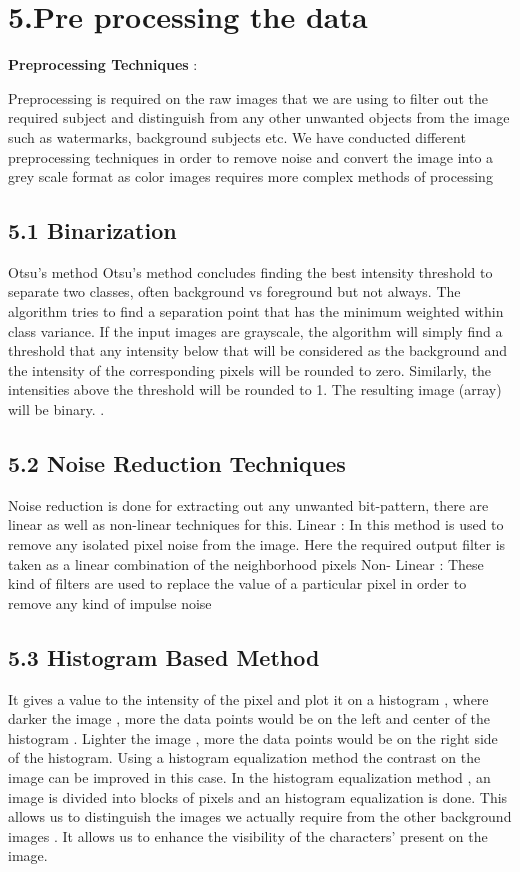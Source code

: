 \documentclass[9pt,twocolumn,twoside]{../../styles/osajnl}
\begin{document}
\section{5.Pre processing the data}


\textbf{Preprocessing Techniques} :

Preprocessing is required on the raw images that we are using to
filter out the required subject and distinguish from any other
unwanted objects from the image such as watermarks, background
subjects etc. We have conducted different preprocessing techniques in
order to remove noise and convert the image into a grey scale format
as color images requires more complex methods of processing

\subsection{5.1 Binarization}

Otsu’s method \cite{otsu1975threshold} Otsu’s method concludes finding
the best intensity threshold to separate two classes, often background
vs foreground but not always. The algorithm tries to find a separation
point that has the minimum weighted within class variance.  If the
input images are grayscale, the algorithm will simply find a threshold
that any intensity below that will be considered as the background and
the intensity of the corresponding pixels will be rounded to
zero. Similarly, the intensities above the threshold will be rounded
to 1. The resulting image (array) will be binary.  .
 
\subsection{5.2 Noise Reduction Techniques}

Noise reduction is done for extracting out any unwanted bit-pattern,
there are linear as well as non-linear techniques for this.  Linear :
In this method is used to remove any isolated pixel noise from the
image. Here the required output filter is taken as a linear
combination of the neighborhood pixels Non- Linear : These kind of
filters are used to replace the value of a particular pixel in order
to remove any kind of impulse noise

\subsection{5.3 Histogram Based Method}

It gives a value to the intensity of the pixel and plot it on a
histogram , where darker the image , more the data points would be on
the left and center of the histogram . Lighter the image , more the
data points would be on the right side of the histogram. Using a
histogram equalization method the contrast on the image can be
improved in this case. In the histogram equalization method , an image
is divided into blocks of pixels and an histogram equalization is
done.  This allows us to distinguish the images we actually require
from the other background images . It allows us to enhance the
visibility of the characters’ present on the image.
\end{document}
